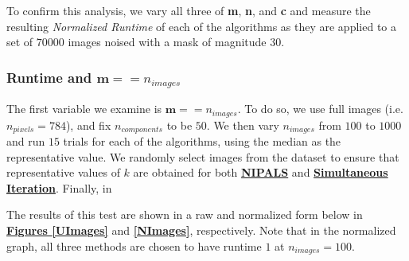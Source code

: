 \documentclass[12pt]{article}
\begin{document}
To confirm this analysis, we vary all three of \textbf{m}, \textbf{n}, and \textbf{c} and measure the resulting \textit{Normalized Runtime} of each of the algorithms as they are applied to a set of $70000$ images noised with a mask of magnitude $30$.

\subsubsection{Runtime and $\textbf{m} == n_{images}$}\label{5.1.2}

The first variable we examine is $\textbf{m} == n_{images}$. To do so, we use full images (i.e. $n_{pixels}=784$), and fix $n_{components}$ to be $50$. We then vary $n_{images}$ from $100$ to $1000$ and run $15$ trials for each of the algorithms, using the median as the representative value. We randomly select images from the dataset to ensure that representative values of $k$ are obtained for both \textbf{\hyperref[3.1]{NIPALS}} and \textbf{\hyperref[3.3]{Simultaneous Iteration}}. Finally, in 

The results of this test are shown in a raw and normalized form below in \textbf{\hyperref[UPixels]{Figures \ref*{UImages}}} and \textbf{\hyperref[NPixels]{\ref*{NImages}}}, respectively. Note that in the normalized graph, all three methods are chosen to have runtime $1$ at $n_{images} = 100$.
\end{document}
